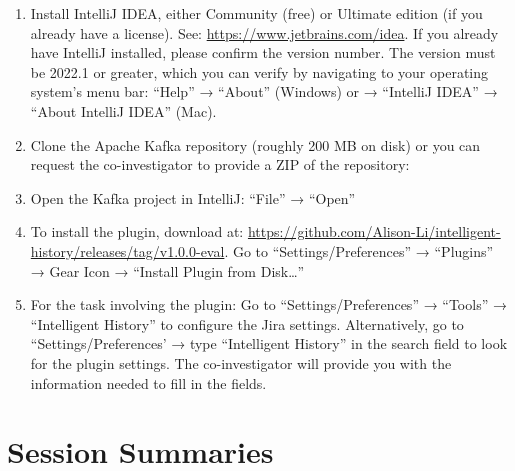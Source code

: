 \begin{enumerate}
    \item Install IntelliJ IDEA, either Community (free) or Ultimate edition (if you already have a license). 
        See: \url{https://www.jetbrains.com/idea}. If you already have IntelliJ installed, please confirm the version number. 
        The version must be 2022.1 or greater, which you can verify by navigating to your operating system's menu bar: 
        ``Help'' → ``About'' (Windows) or → ``IntelliJ IDEA'' → ``About IntelliJ IDEA'' (Mac).
    \item Clone the Apache Kafka repository (roughly 200 MB on disk) or you can request the co-investigator to provide a ZIP of the repository: 
    
    \begin{center}
    \end{center}

    \item Open the Kafka project in IntelliJ: ``File'' → ``Open''
    \item To install the plugin, download  at: \url{https://github.com/Alison-Li/intelligent-history/releases/tag/v1.0.0-eval}. Go to “Settings/Preferences” → ``Plugins'' → Gear Icon → ``Install Plugin from Disk\dots''
    \item For the task involving the plugin: Go to ``Settings/Preferences'' → ``Tools'' → ``Intelligent History'' to configure the Jira settings. Alternatively, go to “Settings/Preferences’ → type ``Intelligent History'' in the search field to look for the plugin settings. The co-investigator will provide you with the information needed to fill in the fields.
\end{enumerate}


\pagebreak

\section{Session Summaries}
\label{sec:Summaries}

